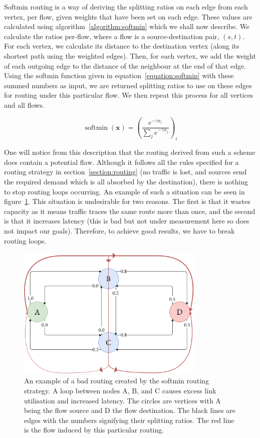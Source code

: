 Softmin routing is a way of deriving the splitting ratios on each edge from each vertex, per flow, given weights that have been set on each edge. These values are calculated using algorithm~\ref{algorithm:softmin} which we shall now describe. We calculate the ratios per-flow, where a flow is a source-destination pair, $(s,t)$. For each vertex, we calculate its distance to the destination vertex (along its shortest path using the weighted edges). Then, for each vertex, we add the weight of each outgoing edge to the distance of the neighbour at the end of that edge. Using the softmin function given in equation~\ref{equation:softmin} with these summed numbers as input, we are returned splitting ratios to use on these edges for routing under this particular flow. We then repeat this process for all vertices and all flows.

\begin{equation}
  \label{equation:softmin}
  \operatorname{softmin}(\bm{x}) = \left(\frac{e^{-\gamma x_i}}{\sum_{j}{e^{-\gamma x_j}}}\right)_i
\end{equation}

One will notice from this description that the routing derived from such a scheme does contain a potential flaw. Although it follows all the rules specified for a routing strategy in section~\ref{section:routing} (no traffic is lost, and sources send the required demand which is all absorbed by the destination), there is nothing to stop routing loops occurring. An example of such a situation can be seen in figure~\ref{fig:bad_route}. This situation is undesirable for two reasons. The first is that it wastes capacity as it means traffic traces the same route more than once, and the second is that it increases latency (this is bad but not under measurement here so does not impact our goals). Therefore, to achieve good results, we have to break routing loops.

\begin{figure}
    \centering
    \includegraphics[width=0.8\textwidth]{figures/bad_route.pdf}
    \caption{An example of a bad routing created by the softmin routing strategy. A loop between nodes A, B, and C causes excess link utilisation and increased latency. The circles are vertices with A being the flow source and D the flow destination. The black lines are edges with the numbers signifying their splitting ratios. The red line is the flow induced by this particular routing.}
    \label{fig:bad_route}
\end{figure}

